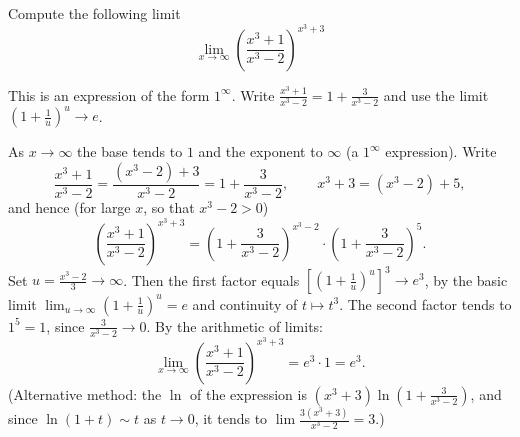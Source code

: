
\begin{question}
Compute the following limit
\[ \lim_{x\to\infty} \left( \frac{x^3 + 1}{x^3 - 2} \right)^{x^3 + 3} \]
\end{question}

\begin{hint}
This is an expression of the form $1^\infty$. Write $\frac{x^3 + 1}{x^3 - 2} = 1 + \frac{3}{x^3 - 2}$ and use the limit $\left(1 + \frac{1}{u}\right)^u \to e$.
\end{hint}

\begin{solution}
As $x \to \infty$ the base tends to $1$ and the exponent to $\infty$ (a $1^\infty$ expression). Write
\[ \frac{x^3 + 1}{x^3 - 2} = \frac{(x^3 - 2) + 3}{x^3 - 2} = 1 + \frac{3}{x^3 - 2}, \qquad x^3 + 3 = (x^3 - 2) + 5, \]
and hence (for large $x$, so that $x^3 - 2 > 0$)
\[ \left( \frac{x^3 + 1}{x^3 - 2} \right)^{x^3 + 3} = \left( 1 + \frac{3}{x^3 - 2} \right)^{x^3 - 2} \cdot \left( 1 + \frac{3}{x^3 - 2} \right)^{5}. \]
Set $u = \frac{x^3 - 2}{3} \to \infty$. Then the first factor equals $\left[\left(1 + \frac{1}{u}\right)^{u}\right]^3 \to e^3$, by the basic limit $\lim_{u\to\infty}\left(1 + \frac1u\right)^u = e$ and continuity of $t \mapsto t^3$.
The second factor tends to $1^5 = 1$, since $\frac{3}{x^3 - 2} \to 0$.
By the arithmetic of limits:
\[ \boxed{\lim_{x\to\infty} \left( \frac{x^3 + 1}{x^3 - 2} \right)^{x^3 + 3} = e^3 \cdot 1 = e^3}. \]
(Alternative method: the $\ln$ of the expression is $(x^3 + 3)\ln\left(1 + \frac{3}{x^3 - 2}\right)$, and since $\ln(1 + t) \sim t$ as $t \to 0$, it tends to $\lim \frac{3(x^3 + 3)}{x^3 - 2} = 3$.)
\end{solution}
